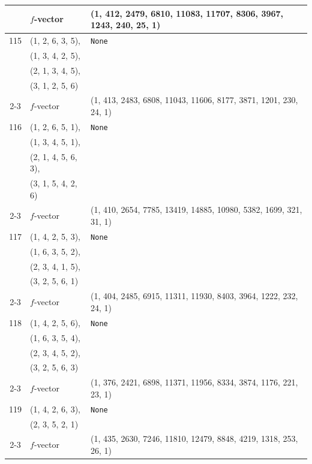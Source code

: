 \documentclass[10pt]{amsart}
\numberwithin{equation}{section}
\theoremstyle{plain}
\theoremstyle{definition}
\theoremstyle{remark}
\begin{document}
{\begin{longtable}{c|l|l}
		& $f$-vector & {(1, 412, 2479, 6810, 11083, 11707, 8306, 3967, 1243, 240, 25, 1)} \\
		\midrule
		
		115 & (1, 2, 6, 3, 5), & \texttt{None} \\
		& (1, 3, 4, 2, 5), &  \\
		& (2, 1, 3, 4, 5), &  \\
		& (3, 1, 2, 5, 6) &  \\ \cline{2-3}
		
		& $f$-vector & {(1, 413, 2483, 6808, 11043, 11606, 8177, 3871, 1201, 230, 24, 1)} \\
		\midrule
		
		116 & (1, 2, 6, 5, 1), & \texttt{None} \\
		& (1, 3, 4, 5, 1), &  \\
		& (2, 1, 4, 5, 6, 3), &  \\
		& (3, 1, 5, 4, 2, 6) &  \\ \cline{2-3}
		
		& $f$-vector & {(1, 410, 2654, 7785, 13419, 14885, 10980, 5382, 1699, 321, 31, 1)} \\
		\midrule
		
		117 & (1, 4, 2, 5, 3), & \texttt{None} \\
		& (1, 6, 3, 5, 2), &  \\
		& (2, 3, 4, 1, 5), &  \\
		& (3, 2, 5, 6, 1) &  \\ \cline{2-3}
		
		& $f$-vector & {(1, 404, 2485, 6915, 11311, 11930, 8403, 3964, 1222, 232, 24, 1)} \\
		\midrule
		
		118 & (1, 4, 2, 5, 6), & \texttt{None} \\
		& (1, 6, 3, 5, 4), &  \\
		& (2, 3, 4, 5, 2), &  \\
		& (3, 2, 5, 6, 3) &  \\ \cline{2-3}
		
		& $f$-vector & {(1, 376, 2421, 6898, 11371, 11956, 8334, 3874, 1176, 221, 23, 1)} \\
		\midrule
		
		119 & (1, 4, 2, 6, 3), & \texttt{None} \\
		& (2, 3, 5, 2, 1) &  \\ \cline{2-3}
		
		& $f$-vector & {(1, 435, 2630, 7246, 11810, 12479, 8848, 4219, 1318, 253, 26, 1)} \\
		\midrule
		

\end{longtable}}
\end{document}
